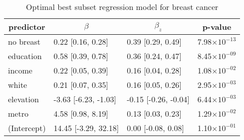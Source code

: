 %
\begin{table}[!tbp]
\caption{Optimal best subset regression model for breast cancer\label{SI_tab:breast}} 
\begin{center}
\begin{tabular}{llll}
\hline\hline
\multicolumn{1}{c}{predictor}&\multicolumn{1}{c}{$\beta$}&\multicolumn{1}{c}{$\beta_z$}&\multicolumn{1}{c}{p-value}\tabularnewline
\hline
no breast&0.22 [0.16, 0.28]&0.39 [0.29, 0.49]&7.98$\times10^{-13}$\tabularnewline
education&0.58 [0.39, 0.78]&0.36 [0.24, 0.47]&8.45$\times10^{-09}$\tabularnewline
income&0.22 [0.05, 0.39]&0.16 [0.04, 0.28]&1.08$\times10^{-02}$\tabularnewline
white&0.21 [0.07, 0.35]&0.16 [0.05, 0.26]&2.95$\times10^{-03}$\tabularnewline
elevation&-3.63 [-6.23, -1.03]&-0.15 [-0.26, -0.04]&6.44$\times10^{-03}$\tabularnewline
metro&4.58 [0.98, 8.19]&0.13 [0.03, 0.23]&1.29$\times10^{-02}$\tabularnewline
(Intercept)&14.45 [-3.29, 32.18]&0.00 [-0.08, 0.08]&1.10$\times10^{-01}$\tabularnewline
\hline
\end{tabular}
\end{center}
\end{table}

